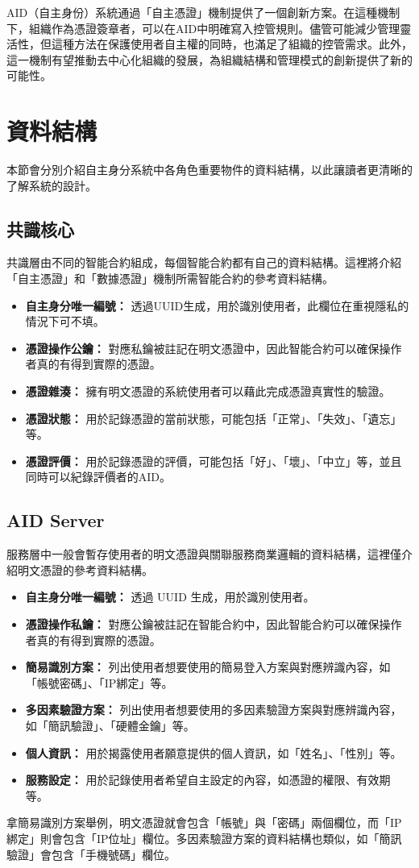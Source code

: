AID（自主身份）系統通過「自主憑證」機制提供了一個創新方案。在這種機制下，組織作為憑證簽章者，可以在AID中明確寫入控管規則。儘管可能減少管理靈活性，但這種方法在保護使用者自主權的同時，也滿足了組織的控管需求。此外，這一機制有望推動去中心化組織的發展，為組織結構和管理模式的創新提供了新的可能性。
\section{資料結構}
本節會分別介紹自主身分系統中各角色重要物件的資料結構，以此讓讀者更清晰的了解系統的設計。
\subsection{共識核心}
共識層由不同的智能合約組成，每個智能合約都有自己的資料結構。這裡將介紹「自主憑證」和「數據憑證」機制所需智能合約的參考資料結構。
\begin{itemize}
  \item \textbf{自主身分唯一編號：} 透過UUID生成，用於識別使用者，此欄位在重視隱私的情況下可不填。
  \item \textbf{憑證操作公鑰：} 對應私鑰被註記在明文憑證中，因此智能合約可以確保操作者真的有得到實際的憑證。
  \item \textbf{憑證雜湊：} 擁有明文憑證的系統使用者可以藉此完成憑證真實性的驗證。
  \item \textbf{憑證狀態：} 用於記錄憑證的當前狀態，可能包括「正常」、「失效」、「遺忘」等。
  \item \textbf{憑證評價：} 用於記錄憑證的評價，可能包括「好」、「壞」、「中立」等，並且同時可以紀錄評價者的AID。
\end{itemize}
\subsection{AID Server}
服務層中一般會暫存使用者的明文憑證與關聯服務商業邏輯的資料結構，這裡僅介紹明文憑證的參考資料結構。
\begin{itemize}
  \item \textbf{自主身分唯一編號：} 透過 UUID 生成，用於識別使用者。
  \item \textbf{憑證操作私鑰：} 對應公鑰被註記在智能合約中，因此智能合約可以確保操作者真的有得到實際的憑證。
  \item \textbf{簡易識別方案：} 列出使用者想要使用的簡易登入方案與對應辨識內容，如「帳號密碼」、「IP綁定」等。
  \item \textbf{多因素驗證方案：} 列出使用者想要使用的多因素驗證方案與對應辨識內容，如「簡訊驗證」、「硬體金鑰」等。
  \item \textbf{個人資訊：} 用於揭露使用者願意提供的個人資訊，如「姓名」、「性別」等。
  \item \textbf{服務設定：} 用於記錄使用者希望自主設定的內容，如憑證的權限、有效期等。
\end{itemize}
拿簡易識別方案舉例，明文憑證就會包含「帳號」與「密碼」兩個欄位，而「IP綁定」則會包含「IP位址」欄位。多因素驗證方案的資料結構也類似，如「簡訊驗證」會包含「手機號碼」欄位。

